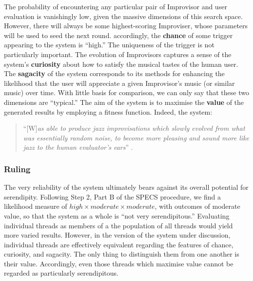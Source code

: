 The probability of encountering any particular pair of Improvisor and
user evaluation is vanishingly low, given the massive dimensions of
this search space.  However, there will always be some highest-scoring
Improviser, whose parameters will be used to seed the next round.
accordingly, the \textbf{chance} of some trigger appearing to the
system is ``high.''  The uniqueness of the trigger is not particularly
important.  The evolution of Improvisors captures a sense of the
system's \textbf{curiosity} about how to satisfy the musical tastes of
the human user.  The \textbf{sagacity} of the system corresponds to its
methods for enhancing the likelihood that the user will appreciate a
given Improvisor's music (or similar music) over time.  With little
basis for comparison, we can only say that these two dimensions are
``typical.''  The aim of the system is to maximise the \textbf{value}
of the generated results by employing a fitness function.  Indeed,
the system:
\begin{quote}
``{[}W{]}\emph{as able to produce jazz improvisations which slowly
    evolved from what was essentially random noise, to become more
    pleasing and sound more like jazz to the human evaluator's ears}''
  \cite{jordanous10}.
\end{quote}

\subsubsection{Ruling}
The very reliability of the system ultimately bears against its
overall potential for serendipity.  Following Step 2, Part B of the
SPECS procedure, we find a likelihood measure of
$\mathit{high}\times\mathit{moderate}\times\mathit{moderate}$, with
outcomes of moderate value, so that the system as a whole is ``not
very serendipitous.''  Evaluating individual threads as members of a
the population of all threads would yield more varied results.
However, in the version of the system under discussion, individual
threads are effectively equivalent regarding the features of chance,
curiosity, and sagacity.  The only thing to distinguish them from one
another is their value.  Accordingly, even those threads which
maximise value cannot be regarded as particularly serendipitous.


